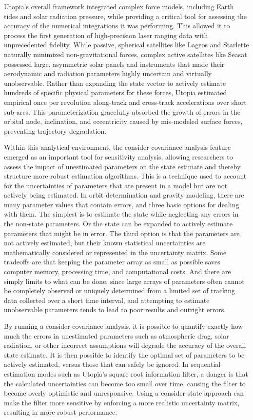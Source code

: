 Utopia’s overall framework integrated complex force models, including Earth tides and solar radiation pressure, while providing a critical tool for assessing the accuracy of the numerical integrations it was performing. This allowed it to process the first generation of high-precision laser ranging data with unprecedented fidelity. While passive, spherical satellites like Lageos and Starlette naturally minimized non-gravitational forces, complex active satellites like Seasat possessed large, asymmetric solar panels and instruments that made their aerodynamic and radiation parameters highly uncertain and virtually unobservable. Rather than expanding the state vector to actively estimate hundreds of specific physical parameters for these forces, Utopia estimated empirical once per revolution along-track and cross-track accelerations over short sub-arcs. This parameterization gracefully absorbed the growth of errors in the orbital node, inclination, and eccentricity caused by mis-modeled surface forces, preventing trajectory degradation.
 
Within this analytical environment, the consider-covariance analysis feature emerged as an important tool for sensitivity analysis, allowing researchers to assess the impact of unestimated parameters on the state estimate and thereby structure more robust estimation algorithms. This is a technique used to account for the uncertainties of parameters that are present in a model but are not actively being estimated. In orbit determination and gravity modeling, there are many parameter values that contain errors, and three basic options for dealing with them. The simplest is to estimate the state while neglecting any errors in the non-state parameters. Or the state can be expanded to actively estimate parameters that might be in error. The third option is that the parameters are not actively estimated, but their known statistical uncertainties are mathematically considered or represented in the uncertainty matrix. Some tradeoffs are that keeping the parameter array as small as possible saves computer memory, processing time, and computational costs. And there are simply limits to what can be done, since large arrays of parameters often cannot be completely observed or uniquely determined from a limited set of tracking data collected over a short time interval, and attempting to estimate unobservable parameters tends to lead to poor results and outright errors.

By running a consider-covariance analysis, it is possible to quantify exactly how much the errors in unestimated parameters such as atmospheric drag, solar radiation, or other incorrect assumptions will degrade the accuracy of the overall state estimate. It is then possible to identify the optimal set of parameters to be actively estimated, versus those that can safely be ignored. In sequential estimation modes such as Utopia’s square root information filter, a danger is that the calculated uncertainties can become too small over time, causing the filter to become overly optimistic and unresponsive. Using a consider-state approach can make the filter more sensitive by enforcing a more realistic uncertainty matrix, resulting in more robust performance. 

